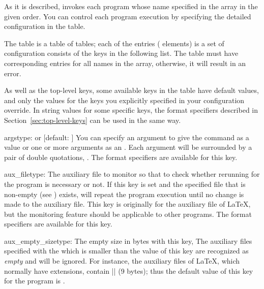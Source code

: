 \documentclass[draft]{llmk-doc}
\begin{document}
As it is described,  invokes each program whose name specified in
the  array in the given order. You can control each program
execution by specifying the detailed configuration in the 
table.

The  table is a table of tables; each of the entries (\aka
elements) is a set of configuration consists of the keys in the following list.
The  table must have corresponding entries for all names in the
 array, otherwise, it will result in an error.

As well as the top-level keys, some available keys in the  table
have default values, and only the values for the keys you explicitly specified
in your configuration override. In string values for some specific keys, the
format specifiers described in Section~\ref{sec:top-level-keys} can be used in
the same way.

\begin{confkey}{args}{type:  or }
  [default: \code{["\%T"]}]
You can specify an argument to give the command as a  value or one
or more arguments as an . Each argument will be
surrounded by a pair of double quotations, \eg {}. The format
specifiers are available for this key.
\end{confkey}

\begin{confkey}{aux\_file}{type: }
The auxiliary file to monitor so that to check whether rerunning for the
program is necessary or not. If this key is set and the specified file that is
non-empty (see ) exists,  will repeat the
program execution until no change is made to the auxiliary file. This key is
originally for the auxiliary file of {\LaTeX}, but the monitoring feature
should be applicable to other programs. The format specifiers are available
for this key.
\end{confkey}

\begin{confkey}{aux\_empty\_size}{type: }
The empty size in bytes with this key, The auxiliary files specified with the
 which is smaller than the value of this key are recognized as
\emph{empty} and will be ignored. For instance, the auxiliary files of {\LaTeX},
which normally have  extensions, contain
|\textvisiblespace{}| (9 bytes); thus the default
value of this key for the  program is .
\end{confkey}
\end{document}
